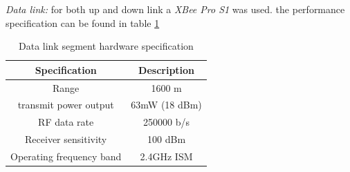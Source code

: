 \textit{Data link:}
for both up and down link a \textit{XBee Pro S1} was used. the performance specification can be found in table \ref{Table:XBee}
\begin{table}[H]
\centering
\begin{tabular}{|c|c|}
\hline
Specification           & Description   \\ \hline
Range                    & 1600 m        \\ \hline
transmit power output    & 63mW (18 dBm) \\ \hline
RF data rate             & 250000 b/s    \\ \hline
Receiver sensitivity     & 100 dBm       \\ \hline
Operating frequency band & 2.4GHz ISM    \\ \hline
\end{tabular}
\caption{Data link segment hardware specification}
\label{Table:XBee}
\end{table}

